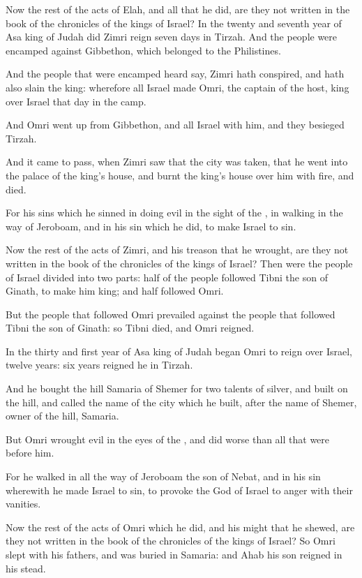 \verse Now the rest of the acts of Elah, and all that he did, are they not written in the book of the chronicles of the kings of Israel?  \verse In the twenty and seventh year of Asa king of Judah did Zimri reign seven days in Tirzah. And the people were encamped against Gibbethon, which belonged to the Philistines.

\verse And the people that were encamped heard say, Zimri hath conspired, and hath also slain the king: wherefore all Israel made Omri, the captain of the host, king over Israel that day in the camp.

\verse And Omri went up from Gibbethon, and all Israel with him, and they besieged Tirzah.

\verse And it came to pass, when Zimri saw that the city was taken, that he went into the palace of the king's house, and burnt the king's house over him with fire, and died.

\verse For his sins which he sinned in doing evil in the sight of the \LORD, in walking in the way of Jeroboam, and in his sin which he did, to make Israel to sin.

\verse Now the rest of the acts of Zimri, and his treason that he wrought, are they not written in the book of the chronicles of the kings of Israel?  \verse Then were the people of Israel divided into two parts: half of the people followed Tibni the son of Ginath, to make him king; and half followed Omri.

\verse But the people that followed Omri prevailed against the people that followed Tibni the son of Ginath: so Tibni died, and Omri reigned.

\verse In the thirty and first year of Asa king of Judah began Omri to reign over Israel, twelve years: six years reigned he in Tirzah.

\verse And he bought the hill Samaria of Shemer for two talents of silver, and built on the hill, and called the name of the city which he built, after the name of Shemer, owner of the hill, Samaria.

\verse But Omri wrought evil in the eyes of the \LORD, and did worse than all that were before him.

\verse For he walked in all the way of Jeroboam the son of Nebat, and in his sin wherewith he made Israel to sin, to provoke the \LORD God of Israel to anger with their vanities.

\verse Now the rest of the acts of Omri which he did, and his might that he shewed, are they not written in the book of the chronicles of the kings of Israel?  \verse So Omri slept with his fathers, and was buried in Samaria: and Ahab his son reigned in his stead.

